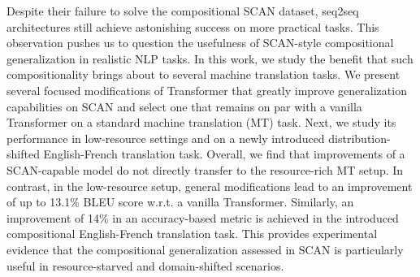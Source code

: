 Despite their failure to solve the compositional SCAN dataset, seq2seq architectures still achieve astonishing success on more practical tasks. This observation pushes us to question the usefulness of SCAN-style compositional generalization in realistic NLP tasks. In this work, we study the benefit that such compositionality brings about to several machine translation tasks. We present several focused modifications of Transformer that greatly improve generalization capabilities on SCAN and select one that remains on par with a vanilla Transformer on a standard machine translation (MT) task. Next, we study its performance in low-resource settings and on a newly introduced distribution-shifted English-French translation task. Overall, we find that improvements of a SCAN-capable model do not directly transfer to the resource-rich MT setup. In contrast, in the low-resource setup, general modifications lead to an improvement of up to 13.1\% BLEU score w.r.t. a vanilla Transformer. Similarly, an improvement of 14\% in an accuracy-based metric is achieved in the introduced compositional English-French translation task. This provides experimental evidence that the compositional generalization assessed in SCAN is particularly useful in resource-starved and domain-shifted scenarios.

